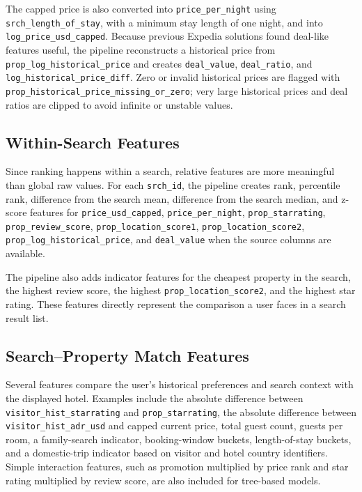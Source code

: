 The capped price is also converted into \texttt{price\_per\_night} using \texttt{srch\_length\_of\_stay}, with a minimum stay length of one night, and into \texttt{log\_price\_usd\_capped}. Because previous Expedia solutions found deal-like features useful, the pipeline reconstructs a historical price from \texttt{prop\_log\_historical\_price} and creates \texttt{deal\_value}, \texttt{deal\_ratio}, and \texttt{log\_historical\_price\_diff}. Zero or invalid historical prices are flagged with \texttt{prop\_historical\_price\_missing\_or\_zero}; very large historical prices and deal ratios are clipped to avoid infinite or unstable values.

\subsection{Within-Search Features}

Since ranking happens within a search, relative features are more meaningful than global raw values. For each \texttt{srch\_id}, the pipeline creates rank, percentile rank, difference from the search mean, difference from the search median, and z-score features for \texttt{price\_usd\_capped}, \texttt{price\_per\_night}, \texttt{prop\_starrating}, \texttt{prop\_review\_score}, \texttt{prop\_location\_score1}, \texttt{prop\_location\_score2}, \texttt{prop\_log\_historical\_price}, and \texttt{deal\_value} when the source columns are available.

The pipeline also adds indicator features for the cheapest property in the search, the highest review score, the highest \texttt{prop\_location\_score2}, and the highest star rating. These features directly represent the comparison a user faces in a search result list.

\subsection{Search--Property Match Features}

Several features compare the user's historical preferences and search context with the displayed hotel. Examples include the absolute difference between \texttt{visitor\_hist\_starrating} and \texttt{prop\_starrating}, the absolute difference between \texttt{visitor\_hist\_adr\_usd} and capped current price, total guest count, guests per room, a family-search indicator, booking-window buckets, length-of-stay buckets, and a domestic-trip indicator based on visitor and hotel country identifiers. Simple interaction features, such as promotion multiplied by price rank and star rating multiplied by review score, are also included for tree-based models.

